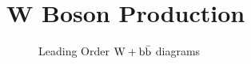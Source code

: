 \chapter{W Boson Production}
\begin{figure}[t]
\centering
  \begin{subfigure}[b]{.35\textwidth}
	\end{subfigure}	
   \begin{subfigure}[b]{.35\textwidth}
    \end{subfigure}	
  	\caption[Leading Order $\Wbb$ diagrams]
   	{Leading Order $\Wbb$ diagrams}

	\label{fig:WbbLO}
\end{figure}

